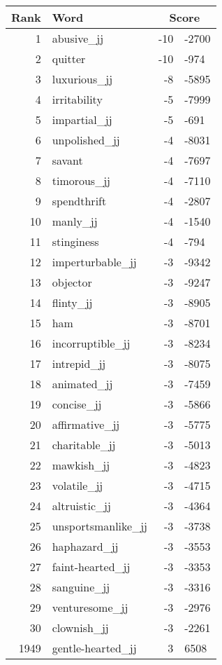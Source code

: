 \begin{longtable}[!htbp]{| rlr@{.}l |}
    \hline
    \textbf{Rank} & \textbf{Word} & \multicolumn{2}{c|}{\textbf{Score}} \\
    \hline
    \endhead
    1 & abusive\_jj & -10 & -2700 \\
    2 & quitter & -10 & -974 \\
    3 & luxurious\_jj & -8 & -5895 \\
    4 & irritability & -5 & -7999 \\
    5 & impartial\_jj & -5 & -691 \\
    6 & unpolished\_jj & -4 & -8031 \\
    7 & savant & -4 & -7697 \\
    8 & timorous\_jj & -4 & -7110 \\
    9 & spendthrift & -4 & -2807 \\
    10 & manly\_jj & -4 & -1540 \\
    11 & stinginess & -4 & -794 \\
    12 & imperturbable\_jj & -3 & -9342 \\
    13 & objector & -3 & -9247 \\
    14 & flinty\_jj & -3 & -8905 \\
    15 & ham & -3 & -8701 \\
    16 & incorruptible\_jj & -3 & -8234 \\
    17 & intrepid\_jj & -3 & -8075 \\
    18 & animated\_jj & -3 & -7459 \\
    19 & concise\_jj & -3 & -5866 \\
    20 & affirmative\_jj & -3 & -5775 \\
    21 & charitable\_jj & -3 & -5013 \\
    22 & mawkish\_jj & -3 & -4823 \\
    23 & volatile\_jj & -3 & -4715 \\
    24 & altruistic\_jj & -3 & -4364 \\
    25 & unsportsmanlike\_jj & -3 & -3738 \\
    26 & haphazard\_jj & -3 & -3553 \\
    27 & faint-hearted\_jj & -3 & -3353 \\
    28 & sanguine\_jj & -3 & -3316 \\
    29 & venturesome\_jj & -3 & -2976 \\
    30 & clownish\_jj & -3 & -2261 \\
    1949 & gentle-hearted\_jj & 3 & 6508 \\

\end{longtable}
